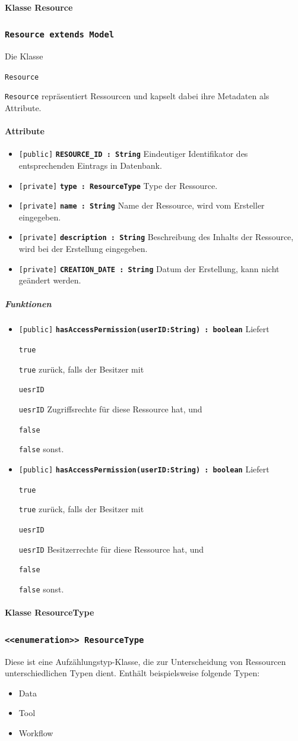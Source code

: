 \documentclass[parskip=full,11pt]{scrartcl}
\makeatletter
\newcommand{\lstInline}[2][,]{%
	\begingroup%
	\lstset{#1}%
	\begin{lrbox}{\mylisting}\lstinline!#2!\end{lrbox}%
	\setlength{\@tempdima}{\linegoal}%
	\ifdim\wd\mylisting>\@tempdima\hfill\\\fi%
	\lstinline!#2!%
	\endgroup%
}
\newcommand{\class}[1]{\subsubsection*{\lstinline[basicstyle=\ttfamily\large]{#1}}}
\newcommand{\atr}[4]{\lstinline{[#3]} \textbf{\lstinline{#1 : #2}} \newline #4}
\newcommand{\mtd}[5]{\lstinline{[#4]} \textbf{\lstinline{#1(#3) : #2}} \newline #5}
\newcommand{\inlinecode}[1]{\lstInline[breaklines=true]{#1}}
\makeatother
\begin{document}
  \paragraph*{Klasse Resource}
  \class{Resource extends Model}
Die Klasse \inlinecode{Resource} repräsentiert Ressourcen und kapselt dabei ihre Metadaten als Attribute. 

\paragraph*{Attribute} %
\begin{itemize}
	\item \atr{RESOURCE_ID}{String}{public}{
	Eindeutiger Identifikator des entsprechenden Eintrags in Datenbank. 
	}
		\item \atr{type}{ResourceType}{private}{
	Type der Ressource.
	}
		\item \atr{name}{String}{private}{
	Name der Ressource, wird vom Ersteller eingegeben. 
	}
		\item \atr{description}{String}{private}{
	Beschreibung des Inhalts der Ressource, wird bei der Erstellung eingegeben.
	}
		\item \atr{CREATION_DATE}{String}{private}{
	Datum der Erstellung, kann nicht geändert werden.
	}
\end{itemize}
\subparagraph*{Funktionen}  %
\begin{itemize}
	\item \mtd{hasAccessPermission}{boolean}{userID:String}{public}{
	Liefert \inlinecode{true} zurück, falls der Besitzer mit  \inlinecode{uesrID} Zugriffsrechte für diese Ressource hat, und \inlinecode{false} sonst.
	}
	\item \mtd{hasAccessPermission}{boolean}{userID:String}{public}{
	Liefert \inlinecode{true} zurück, falls der Besitzer mit  \inlinecode{uesrID} Besitzerrechte für diese Ressource hat, und \inlinecode{false} sonst.
	}
\end{itemize}

  \paragraph*{Klasse ResourceType}
   \class{<<enumeration>> ResourceType}
    Diese ist eine Aufzählungstyp-Klasse, die zur Unterscheidung von Ressourcen unterschiedlichen Typen dient. Enthält beispielsweise folgende Typen: 
 
\begin{itemize}
	\item{Data}
	\item{Tool}
	\item{Workflow}
	
\end{itemize}
\newpage
\end{document}
